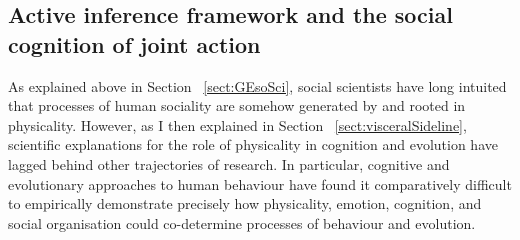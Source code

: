 \begin{CJK}{UTF8}{gbsn}





\subsection{Active inference framework and the social cognition of joint action\label{sect:AIFsoCoJA}}
As explained above in Section ~\ref{sect:GEsoSci}, social scientists have long intuited that processes of human sociality are somehow generated by and rooted in physicality.  However, as I then explained in Section ~\ref{sect:visceralSideline}, scientific explanations for the role of physicality in cognition and evolution have lagged behind other trajectories of research.  In particular, cognitive and evolutionary approaches to human behaviour have found it comparatively difficult to empirically demonstrate precisely how physicality, emotion, cognition, and social organisation could co-determine processes of behaviour and evolution.


\end{CJK}
